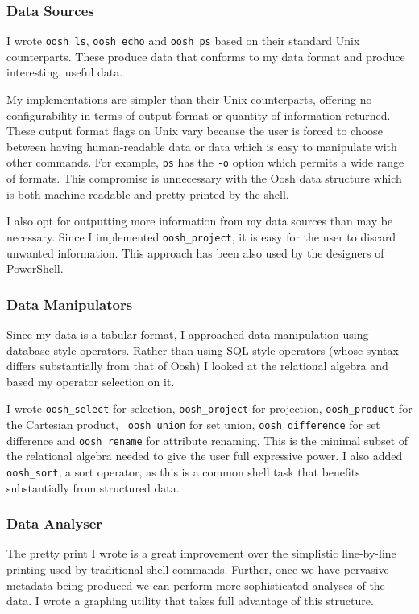 \documentclass[12pt,twoside,notitlepage]{report}
\begin{document}
\subsubsection{Data Sources}
I wrote {\tt oosh\_ls}, {\tt oosh\_echo} and {\tt oosh\_ps} based on their
standard Unix counterparts. These produce data that conforms to my data
format and produce interesting, useful data. 

My implementations are simpler than their Unix counterparts, offering
no configurability in terms of output format or quantity of
information returned. These output format flags on Unix vary because
the user is forced to choose between having human-readable data or
data which is easy to manipulate with other commands. For example,
{\tt ps} has the {\tt -o} option which permits a wide range of
formats. This compromise is unnecessary with the Oosh data structure
which is both machine-readable and pretty-printed by the shell.

I also opt for outputting more information from my data sources than
may be necessary. Since I implemented {\tt oosh\_project}, it is easy
for the user to discard unwanted information. This approach has been
also used by the designers of PowerShell.

\subsubsection{Data Manipulators}
Since my data is a tabular format, I approached data manipulation
using database style operators. Rather than using SQL style operators
(whose syntax differs substantially from that of Oosh) I looked at the
relational algebra and based my operator selection on it.

I wrote {\tt oosh\_select} for selection, {\tt oosh\_project} for
projection, {\tt oosh\_product} for the Cartesian product, {\tt
  oosh\_union} for set union, {\tt oosh\_difference} for set
difference and {\tt oosh\_rename} for attribute renaming. This is the
minimal subset of the relational algebra needed to give the user full
expressive power. I also added {\tt oosh\_sort}, a sort operator, as
this is a common shell task that benefits substantially from
structured data.

\subsubsection{Data Analyser}
The pretty print I wrote is a great improvement over the simplistic
line-by-line printing used by traditional shell commands. Further, once
we have pervasive metadata being produced we can perform more
sophisticated analyses of the data. I wrote a graphing utility that
takes full advantage of this structure.
\end{document}
